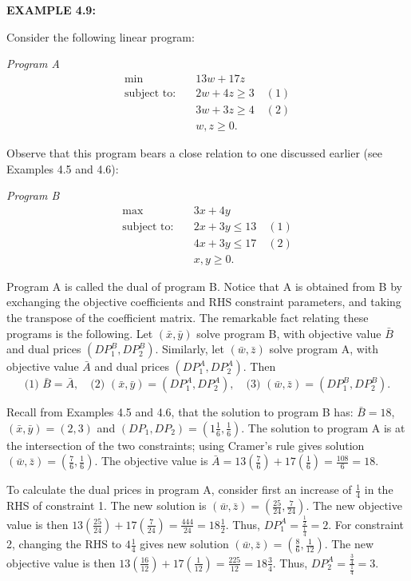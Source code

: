 \bigskip
\noindent\textbf{EXAMPLE 4.9:}
\begin{original}
Consider the following linear program:

\noindent\textit{Program A}
\[
\begin{aligned}
\min \quad & 13w + 17z \\
\text{subject to:} \quad & 2w + 4z \ge 3 \quad (1) \\
& 3w + 3z \ge 4 \quad (2) \\
& w, z \ge 0.
\end{aligned}
\]

Observe that this program bears a close relation to one discussed earlier (see Examples 4.5 and 4.6):

\noindent\textit{Program B}
\[
\begin{aligned}
\max \quad & 3x + 4y \\
\text{subject to:} \quad & 2x + 3y \le 13 \quad (1) \\
& 4x + 3y \le 17 \quad (2) \\
& x, y \ge 0.
\end{aligned}
\]

Program A is called the dual of program B. Notice that A is obtained from B by exchanging the objective coefficients and RHS constraint parameters, and taking the transpose of the coefficient matrix. The remarkable fact relating these programs is the following. Let $(\bar{x}, \bar{y})$ solve program B, with objective value $\bar{B}$ and dual prices $(DP_1^B, DP_2^B)$. Similarly, let $(\bar{w}, \bar{z})$ solve program A, with objective value $\bar{A}$ and dual prices $(DP_1^A, DP_2^A)$. Then
\[
\text{(1) } \bar{B} = \bar{A},\quad \text{(2) } (\bar{x}, \bar{y}) = (DP_1^A, DP_2^A),\quad \text{(3) } (\bar{w}, \bar{z}) = (DP_1^B, DP_2^B).
\]

Recall from Examples 4.5 and 4.6, that the solution to program B has: $\bar{B} = 18$, $(\bar{x}, \bar{y}) = (2, 3)$ and $(DP_1, DP_2) = \left(1\frac{1}{6}, \frac{1}{6}\right)$. The solution to program A is at the intersection of the two constraints; using Cramer's rule gives solution $(\bar{w}, \bar{z}) = \left(\frac{7}{6}, \frac{1}{6}\right)$. The objective value is $\bar{A} = 13\left(\frac{7}{6}\right) + 17\left(\frac{1}{6}\right) = \frac{108}{6} = 18$.

To calculate the dual prices in program A, consider first an increase of $\frac{1}{4}$ in the RHS of constraint 1. The new solution is $(\bar{w}, \bar{z}) = \left(\frac{25}{24}, \frac{7}{24}\right)$. The new objective value is then $13\left(\frac{25}{24}\right) + 17\left(\frac{7}{24}\right) = \frac{444}{24} = 18\frac{1}{2}$. Thus, $DP_1^A = \frac{\frac{1}{2}}{\frac{1}{4}} = 2$. For constraint 2, changing the RHS to $4\frac{1}{4}$ gives new solution $(\bar{w}, \bar{z}) = \left(\frac{8}{6}, \frac{1}{12}\right)$. The new objective value is then $13\left(\frac{16}{12}\right) + 17\left(\frac{1}{12}\right) = \frac{225}{12} = 18\frac{3}{4}$. Thus, $DP_2^A = \frac{\frac{3}{4}}{\frac{1}{4}} = 3$.


\end{original}
